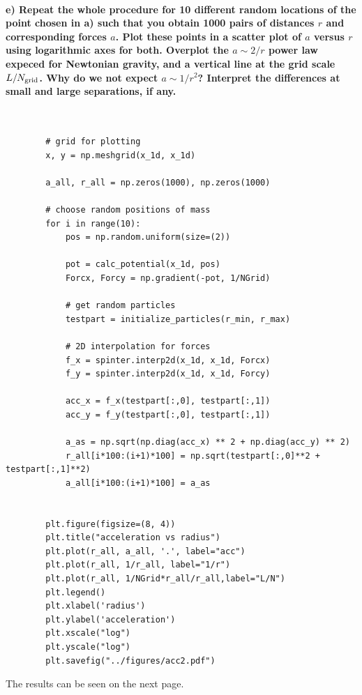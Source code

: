 \newpage
\paragraph{e) Repeat the whole procedure for 10 different random locations of 
    the point chosen in a) such that you obtain 1000 pairs of distances $r$ and 
    corresponding forces $a$. Plot these points in a scatter plot of $a$ versus
    $r$ using logarithmic axes for both. Overplot the $a\sim2/r$ power law 
    expeced for Newtonian gravity, and a vertical line at the grid scale 
    $L/N_\textnormal{grid}$. Why do we not expect $a\sim1/r^2$? Interpret the 
    differences at small and large separations, if any.
} \ \\
    \begin{lstlisting}
        # grid for plotting
        x, y = np.meshgrid(x_1d, x_1d)

        a_all, r_all = np.zeros(1000), np.zeros(1000)

        # choose random positions of mass
        for i in range(10):
            pos = np.random.uniform(size=(2))

            pot = calc_potential(x_1d, pos)
            Forcx, Forcy = np.gradient(-pot, 1/NGrid)

            # get random particles
            testpart = initialize_particles(r_min, r_max)

            # 2D interpolation for forces
            f_x = spinter.interp2d(x_1d, x_1d, Forcx)
            f_y = spinter.interp2d(x_1d, x_1d, Forcy)
        
            acc_x = f_x(testpart[:,0], testpart[:,1])
            acc_y = f_y(testpart[:,0], testpart[:,1])

            a_as = np.sqrt(np.diag(acc_x) ** 2 + np.diag(acc_y) ** 2)
            r_all[i*100:(i+1)*100] = np.sqrt(testpart[:,0]**2 + testpart[:,1]**2)
            a_all[i*100:(i+1)*100] = a_as
        

        plt.figure(figsize=(8, 4))
        plt.title("acceleration vs radius")
        plt.plot(r_all, a_all, '.', label="acc")
        plt.plot(r_all, 1/r_all, label="1/r")
        plt.plot(r_all, 1/NGrid*r_all/r_all,label="L/N")
        plt.legend()
        plt.xlabel('radius')
        plt.ylabel('acceleration')
        plt.xscale("log")
        plt.yscale("log")
        plt.savefig("../figures/acc2.pdf")\end{lstlisting}
        The results can be seen on the next page.

